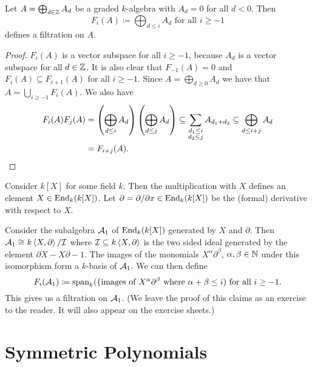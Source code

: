 \begin{lem}
 Let $A = \bigoplus_{d \in \mathbb{Z}} A_d$ be a graded $k$-algebra with $A_d = 0$ for all $d < 0$. Then
 \[
  F_i(A) \coloneqq \bigoplus_{d \leq i} A_d \text{ for all } i \geq -1
 \]
 defines a filtration on $A$.
\end{lem}
\begin{proof}
 $F_i(A)$ is a vector subspace for all $i \geq -1$, because $A_d$ is a vector subspace for all $d \in \mathbb{Z}$. It is also clear that $F_{-1}(A) = 0$ and $F_i(A) \subseteq F_{i+1}(A)$ for all $i \geq -1$. Since $A = \bigoplus_{d \geq 0} A_d$ we have that $A = \bigcup_{i \geq -1} F_i(A)$. We also have
 \begin{align*}
  F_i(A) F_j(A)
  &= \left( \bigoplus_{d \leq i} A_d \right) \left( \bigoplus_{d \leq j} A_d \right)
  \subseteq \sum_{\substack{d_1 \leq i \\ d_2 \leq j}} A_{d_1 + d_2}
  \subseteq \bigoplus_{d \leq i+j} A_d \\
  &= F_{i+j}(A).
  \qedhere
 \end{align*}
\end{proof}


\begin{expl}
 Consider $k[X]$ for some field $k$. Then the multiplication with $X$ defines an element $X \in \operatorname{End}_k(k[X])$. Let $\partial = \partial/\partial x \in \operatorname{End}_k(k[X])$ be the (formal) derivative with respect to $X$.
 
 Consider the subalgebra $\mathcal{A}_1$ of $\operatorname{End}_k(k[X])$ generated by $X$ and $\partial$. Then $\mathcal{A}_1 \cong k\left\langle X,\partial \right\rangle/\mathcal{I}$ where $\mathcal{I} \subseteq k \left\langle X,\partial \right\rangle$ is the two sided ideal generated by the element $\partial X - X \partial - 1$. The images of the monomials $X^\alpha \partial^\beta$, $\alpha, \beta \in \mathbb{N}$ under this isomorphism form a $k$-basis of $\mathcal{A}_1$. We can then define
 \[
  F_i(\mathcal{A}_1) \coloneqq \operatorname{span}_k(\{\text{images of $X^\alpha \partial^\beta$ where $\alpha+\beta \leq i$}) \text{ for all } i \geq -1.
 \]
 This gives us a filtration on $\mathcal{A}_1$. (We leave the proof of this claims as an exercise to the reader. It will also appear on the exercise sheets.)
\end{expl}





\section{Symmetric Polynomials}


